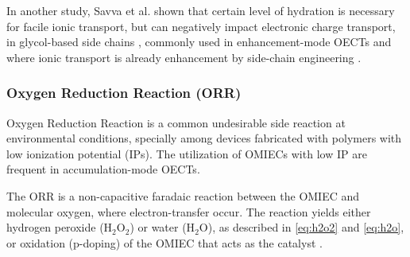 
In another study, Savva et al. shown that certain level of hydration is necessary for facile ionic transport, but can negatively impact electronic charge transport, in glycol-based side chains \cite{savvaBalancingIonicElectronic2020}, commonly used in enhancement-mode OECTs and where ionic transport is already enhancement by side-chain engineering \cite{moiaDesignEvaluationConjugated2019}. %


\subsubsection{Oxygen Reduction Reaction (ORR)}

Oxygen Reduction Reaction is a common undesirable side reaction at environmental conditions, specially among devices fabricated with polymers with low ionization potential (IPs). The utilization of OMIECs with low IP are frequent in accumulation-mode OECTs. 



The ORR is a non-capacitive faradaic reaction between the OMIEC and molecular oxygen, where electron-transfer occur. The reaction yields either hydrogen peroxide (H$_{2}$O$_{2}$) or water (H$_{2}$O), as described in \ref{eq:h2o2} and \ref{eq:h2o}, or oxidation (p-doping) of the OMIEC that acts as the catalyst \cite{giovannittiEnergeticControlRedoxActive2020}. 

